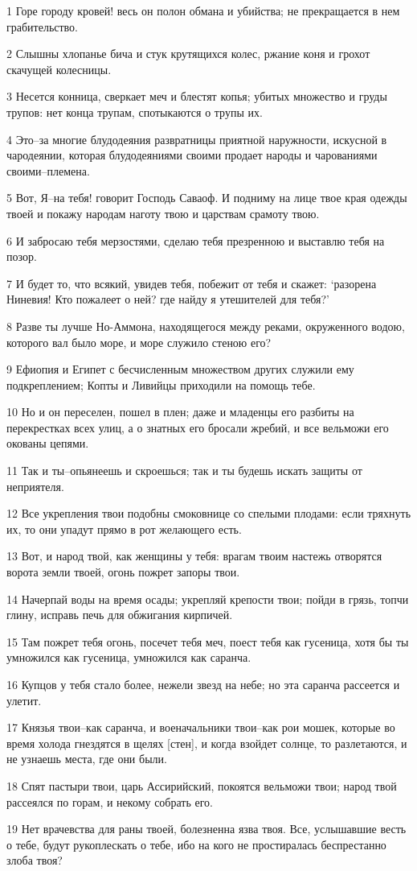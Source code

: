 \par 1 Горе городу кровей! весь он полон обмана и убийства; не прекращается в нем грабительство.
\par 2 Слышны хлопанье бича и стук крутящихся колес, ржание коня и грохот скачущей колесницы.
\par 3 Несется конница, сверкает меч и блестят копья; убитых множество и груды трупов: нет конца трупам, спотыкаются о трупы их.
\par 4 Это--за многие блудодеяния развратницы приятной наружности, искусной в чародеянии, которая блудодеяниями своими продает народы и чарованиями своими--племена.
\par 5 Вот, Я--на тебя! говорит Господь Саваоф. И подниму на лице твое края одежды твоей и покажу народам наготу твою и царствам срамоту твою.
\par 6 И забросаю тебя мерзостями, сделаю тебя презренною и выставлю тебя на позор.
\par 7 И будет то, что всякий, увидев тебя, побежит от тебя и скажет: `разорена Ниневия! Кто пожалеет о ней? где найду я утешителей для тебя?'
\par 8 Разве ты лучше Но-Аммона, находящегося между реками, окруженного водою, которого вал было море, и море служило стеною его?
\par 9 Ефиопия и Египет с бесчисленным множеством других служили ему подкреплением; Копты и Ливийцы приходили на помощь тебе.
\par 10 Но и он переселен, пошел в плен; даже и младенцы его разбиты на перекрестках всех улиц, а о знатных его бросали жребий, и все вельможи его окованы цепями.
\par 11 Так и ты--опьянеешь и скроешься; так и ты будешь искать защиты от неприятеля.
\par 12 Все укрепления твои подобны смоковнице со спелыми плодами: если тряхнуть их, то они упадут прямо в рот желающего есть.
\par 13 Вот, и народ твой, как женщины у тебя: врагам твоим настежь отворятся ворота земли твоей, огонь пожрет запоры твои.
\par 14 Начерпай воды на время осады; укрепляй крепости твои; пойди в грязь, топчи глину, исправь печь для обжигания кирпичей.
\par 15 Там пожрет тебя огонь, посечет тебя меч, поест тебя как гусеница, хотя бы ты умножился как гусеница, умножился как саранча.
\par 16 Купцов у тебя стало более, нежели звезд на небе; но эта саранча рассеется и улетит.
\par 17 Князья твои--как саранча, и военачальники твои--как рои мошек, которые во время холода гнездятся в щелях [стен], и когда взойдет солнце, то разлетаются, и не узнаешь места, где они были.
\par 18 Спят пастыри твои, царь Ассирийский, покоятся вельможи твои; народ твой рассеялся по горам, и некому собрать его.
\par 19 Нет врачевства для раны твоей, болезненна язва твоя. Все, услышавшие весть о тебе, будут рукоплескать о тебе, ибо на кого не простиралась беспрестанно злоба твоя?



